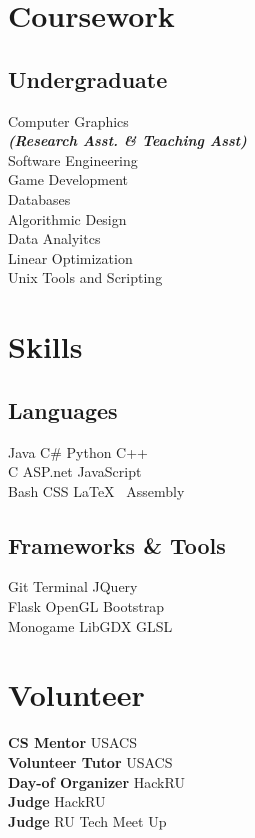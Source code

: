 \documentclass[]{deedy-resume-openfont}
\begin{document}
\begin{minipage}[t]{0.33\textwidth}
\section{Coursework}
\subsection{Undergraduate}
Computer Graphics \\
{\footnotesize \textit{\textbf{(Research Asst. \& Teaching Asst) }}} \\
Software Engineering \\
Game Development \\
Databases \\
Algorithmic Design \\
Data Analyitcs \\
Linear Optimization \\  
Unix Tools and Scripting \\
\sectionsep


\section{Skills}
\subsection{Languages}
Java \textbullet{} C\# \textbullet{} Python \textbullet{} C++ \\
C\textbullet{} ASP.net \textbullet{} JavaScript \\ 
Bash\textbullet{} CSS \textbullet{} \LaTeX\ \textbullet{} Assembly \\
\sectionsep
\sectionsep
\subsection{Frameworks \& Tools}
Git \textbullet{}  Terminal \textbullet{} JQuery\\
Flask\textbullet{} OpenGL\textbullet{} Bootstrap \\ 
Monogame \textbullet{} LibGDX \textbullet{} GLSL
\sectionsep


\section{Volunteer}
\textbf{CS Mentor}  \textbullet{} USACS \\ 
\textbf{Volunteer Tutor} \textbullet{} USACS \\ 
\textbf{Day-of Organizer} \textbullet{} HackRU \\
\textbf{Judge} \textbullet{} HackRU \\
\textbf{Judge} \textbullet{} RU Tech Meet Up \\


\end{minipage}
\end{document}
